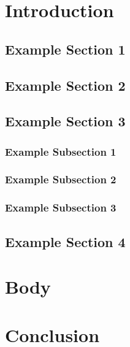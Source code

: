 \documentclass{report}
\begin{document}
	
	
	
	
	
	
	
	
	
	
	
	

	\chapter{Introduction}
	\section{Example Section 1}
	\blindtext[2]

	\blindtext[2]
	\section{Example Section 2}
	\blindtext[5]
	\section{Example Section 3}
	\subsection{Example Subsection 1}
	\blindtext[5]
	\subsection{Example Subsection 2}
	\blindtext[5]
	\subsection{Example Subsection 3}
	\blindtext[5]
	\section{Example Section 4}
	\blindtext[5]
	\autocite{torvalds2001just}
	\autocite{kopka2004guide}
	\autocite{yakaryilmaz2011unbounded}
	\autocite{bernstein2019fast}
	\autocite[11]{almheiri2021entropy}

	\chapter{Body}
	\blindtext[20]

	\chapter{Conclusion}
	\blindtext[10]

	\printbibliography
\end{document}
